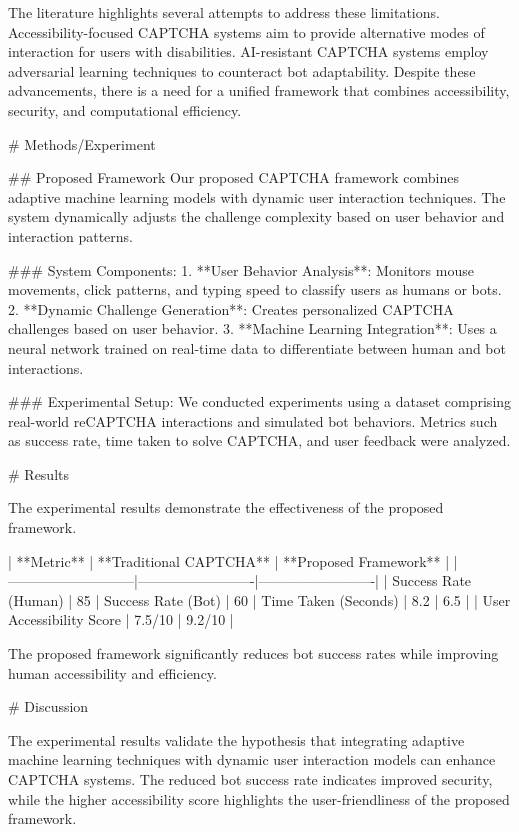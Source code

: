 The literature highlights several attempts to address these limitations. Accessibility-focused CAPTCHA systems aim to provide alternative modes of interaction for users with disabilities. AI-resistant CAPTCHA systems employ adversarial learning techniques to counteract bot adaptability. Despite these advancements, there is a need for a unified framework that combines accessibility, security, and computational efficiency.  

# Methods/Experiment  

## Proposed Framework  
Our proposed CAPTCHA framework combines adaptive machine learning models with dynamic user interaction techniques. The system dynamically adjusts the challenge complexity based on user behavior and interaction patterns.  

### System Components:  
1. **User Behavior Analysis**: Monitors mouse movements, click patterns, and typing speed to classify users as humans or bots.  
2. **Dynamic Challenge Generation**: Creates personalized CAPTCHA challenges based on user behavior.  
3. **Machine Learning Integration**: Uses a neural network trained on real-time data to differentiate between human and bot interactions.  

### Experimental Setup:  
We conducted experiments using a dataset comprising real-world reCAPTCHA interactions and simulated bot behaviors. Metrics such as success rate, time taken to solve CAPTCHA, and user feedback were analyzed.  

# Results  

The experimental results demonstrate the effectiveness of the proposed framework.  

| **Metric**               | **Traditional CAPTCHA** | **Proposed Framework** |  
|---------------------------|-------------------------|-------------------------|  
| Success Rate (Human)      | 85%
| Success Rate (Bot)        | 60%
| Time Taken (Seconds)      | 8.2                    | 6.5                    |  
| User Accessibility Score  | 7.5/10                 | 9.2/10                 |  

The proposed framework significantly reduces bot success rates while improving human accessibility and efficiency.  

# Discussion  

The experimental results validate the hypothesis that integrating adaptive machine learning techniques with dynamic user interaction models can enhance CAPTCHA systems. The reduced bot success rate indicates improved security, while the higher accessibility score highlights the user-friendliness of the proposed framework.  


